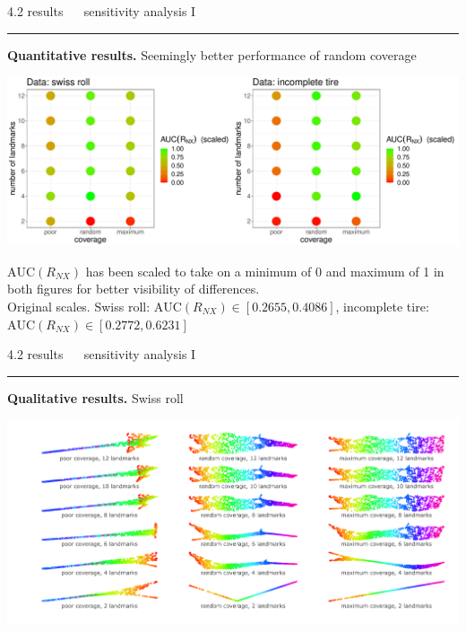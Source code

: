 \documentclass[11pt, compress, t, notes = noshow, xcolor = table, 
aspectratio = 1610]{beamer}
\begin{document}
\LARGE
\begin{frame}{\textcolor{gray!90}{4.2 results} ~~ sensitivity analysis I}
\normalsize
\vspace{-0.5cm}
\noindent \textcolor{gray!90}{\rule{\textwidth}{1pt}}
\smallskip

\textbf{Quantitative results.} Seemingly better performance of random coverage

\vspace{0.3cm}

\includegraphics[trim = 0 0 0 0, clip, %
    width = \textwidth]{figures/sensitivity_landmarks_auc}
    
\vfill

\scriptsize
$\text{AUC}(R_{NX})$ has been scaled to take on a minimum of 0 and maximum of 1 
in both figures for better visibility of differences. \\
Original scales. Swiss roll: $\text{AUC}(R_{NX}) \in [0.2655, 0.4086]$, 
incomplete tire: $\text{AUC}(R_{NX}) \in [0.2772, 0.6231]$

\end{frame}


\LARGE
\begin{frame}{\textcolor{gray!90}{4.2 results} ~~ sensitivity analysis I}
\normalsize
\vspace{-0.5cm}
\noindent \textcolor{gray!90}{\rule{\textwidth}{1pt}}
\smallskip

\textbf{Qualitative results.} Swiss roll

\vspace{0.3cm}

\includegraphics[trim = 40 10 0 0, clip, %
    width = \textwidth]{figures/sensitivity_landmarks_qual_swiss}

\end{frame}
\end{document}
